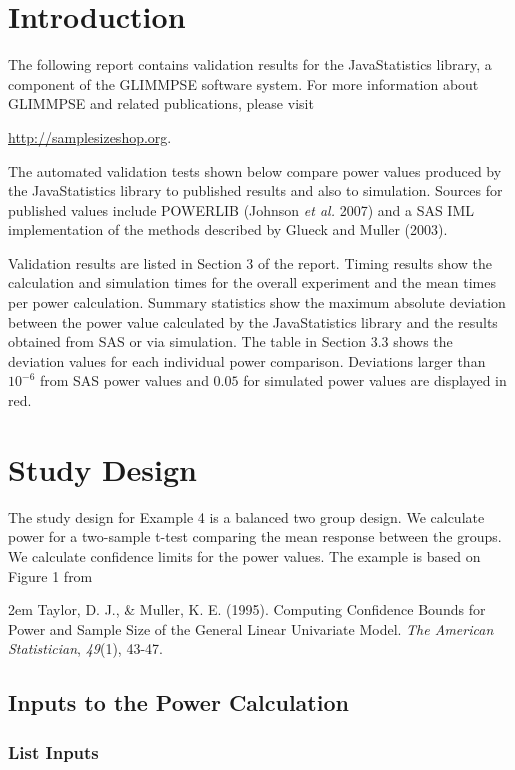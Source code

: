 \documentclass{glimmpse-report}
\begin{document}
\section{Introduction}
The following report contains validation results for the JavaStatistics library, a component of the GLIMMPSE software system.  For more information about GLIMMPSE and related publications, please visit

 

\href{http://samplesizeshop.org}{http://samplesizeshop.org}.

The automated validation tests shown below compare power values produced by the JavaStatistics library to published results and also to simulation.  Sources for published values include POWERLIB (Johnson \emph{et al.} 2007) and a SAS IML implementation of the methods described by Glueck and Muller (2003).

Validation results are listed in Section 3 of the report.  Timing results show the calculation and simulation times for the overall experiment and the mean times per power calculation.  Summary statistics show the maximum absolute deviation between the power value calculated by the JavaStatistics library and the results obtained from SAS or via simulation.  The table in Section 3.3 shows the deviation values for each individual power comparison.  Deviations larger than $10^{-6}$ from SAS power values and $0.05$ for simulated power values are displayed in red.

 \section{Study Design}
The study design for Example 4 is a balanced two group design. We calculate power for a two-sample t-test comparing the mean response between the groups.  We calculate confidence limits for the power values. The example is based on Figure 1 from

\hangindent2em
 Taylor, D. J., \& Muller, K. E. (1995). Computing Confidence Bounds for Power and Sample Size of the General Linear Univariate Model. \emph{The American Statistician}, \emph{49}(1), 43-47.
\subsection{Inputs to the Power Calculation}
\subsubsection{List Inputs}
\end{document}
